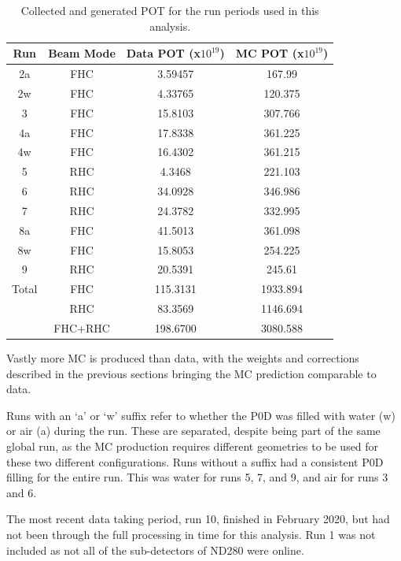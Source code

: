 \begin{center}
\begin{table}
\center
\large
\begin{tabular}{ c|c||c|c}
\hline
\hline
\textbf{Run} & \textbf{Beam Mode} & \textbf{Data POT (x$10^{19}$)} & \textbf{MC POT (x$10^{19}$)} \\
\hline
\hline
2a & FHC & 3.59457 & 167.99 \\
2w & FHC & 4.33765 & 120.375 \\
\hline
3 & FHC & 15.8103 & 307.766 \\
\hline
4a & FHC & 17.8338 & 361.225 \\
4w & FHC & 16.4302 & 361.215 \\
\hline
5 & RHC & 4.3468 & 221.103 \\
\hline
6 & RHC & 34.0928 & 346.986 \\
\hline
7 & RHC & 24.3782 & 332.995 \\
\hline
8a & FHC & 41.5013 & 361.098 \\
8w & FHC & 15.8053 & 254.225 \\
\hline
9 & RHC & 20.5391 & 245.61 \\
\hline \hline
Total & FHC  & 115.3131 & 1933.894 \\ 
& RHC & 83.3569 & 1146.694 \\
& FHC+RHC  & 198.6700  & 3080.588 \\
\hline
\hline

\end{tabular}
\caption{Collected and generated POT for the run periods used in this analysis.}
\label{tab:pot}
\end{table}
\end{center}

Vastly more MC is produced than data, with the weights and corrections described in the previous sections bringing the MC prediction comparable to data. 

Runs with an `a' or `w' suffix refer to whether the P0D was filled with water (w) or air (a) during the run. These are separated, despite being part of the same global run, as the MC production requires different geometries to be used for these two different configurations. Runs without a suffix had a consistent P0D filling for the entire run. This was water for runs 5, 7, and 9, and air for runs 3 and 6.

The most recent data taking period, run 10, finished in February 2020, but had not been through the full processing in time for this analysis. Run 1 was not included as not all of the sub-detectors of ND280 were online.

\newpage